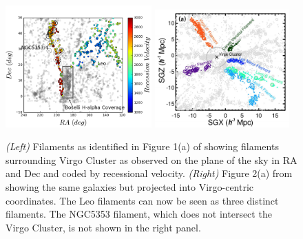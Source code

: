 \documentclass[11pt, preprint]{aastex}
\begin{document}
\begin{figure}[h]
\centering
\includegraphics[width=0.5\textwidth]{filaments.png}
\includegraphics[width=0.46\textwidth]{KimFig2a.png}
\caption{\small {\it (Left)} Filaments as identified in Figure 1(a) of \citet{kim16} showing filaments
  surrounding Virgo Cluster as observed on the plane of the sky in RA and Dec and coded by recessional velocity.  {\it (Right)} Figure 2(a) from \citet{kim16} showing the same galaxies but projected into
Virgo-centric coordinates.  The Leo filaments can now be seen as three
distinct filaments.  The NGC5353 filament, which does not intersect
the Virgo Cluster, is not shown in the right panel.}
\label{kimfigure}
\end{figure}
\end{document}
